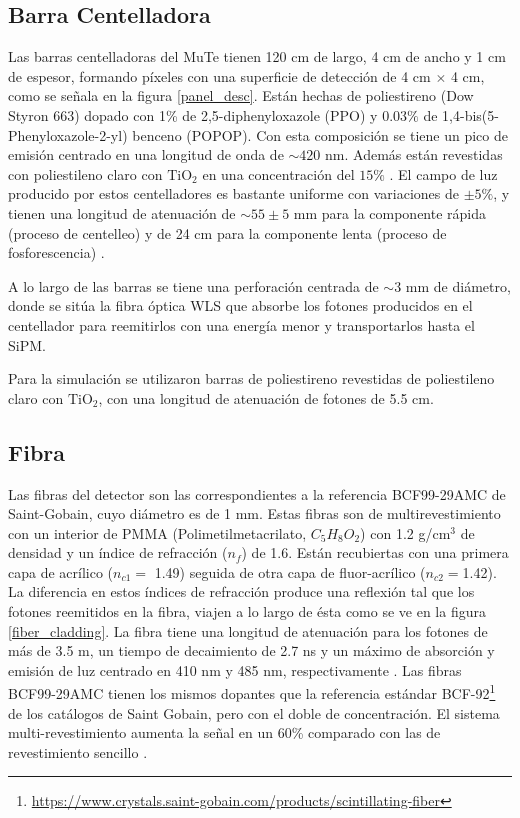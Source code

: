\documentclass[12pt,oneside,openany,letter]{book}
\begin{document}
\subsection{Barra Centelladora}
Las barras centelladoras del MuTe tienen 120 cm de largo, 4 cm de ancho y 1 cm de espesor, formando p\'ixeles con una superficie de detecci\'on de 4 cm $\times$ 4 cm, como se señala en la figura \ref{panel_desc}. Están hechas de poliestireno (Dow Styron 663) dopado con 1\% de 2,5-diphenyloxazole (PPO) y $0.03\%$ de 1,4-bis(5-Phenyloxazole-2-yl) benceno (POPOP). Con esta composición se tiene un pico de emisión centrado en una longitud de onda de $\sim 420 $ nm. Además están revestidas con poliestileno claro con $\text{TiO}_{2}$ en una concentración del $15\%$  \cite{pla-etal2003}. El campo de luz producido por estos centelladores es bastante uniforme con variaciones de $\pm 5 \%$, y tienen una longitud de atenuación de $\sim 55\pm 5$ mm para la componente rápida (proceso de centelleo) y de 24 cm para la componente lenta (proceso de fosforescencia) \cite{amiga-etal2016}.

A lo largo de las barras se tiene una perforación centrada de $\sim 3$ mm de diámetro, donde se sitúa la fibra óptica WLS que absorbe los fotones producidos en el centellador para reemitirlos con una energía menor y transportarlos hasta el SiPM. 

Para la simulaci\'on se utilizaron barras de poliestireno revestidas de poliestileno claro con $\text{TiO}_{2}$, con una longitud de atenuación de fotones de 5.5 cm.

\subsection{Fibra} 
Las fibras del detector son las correspondientes a la referencia BCF99-29AMC de Saint-Gobain, cuyo diámetro es de 1 mm. Estas fibras son de multirevestimiento con un interior de PMMA (Polimetilmetacrilato, $C_5H_8O_2$) con 1.2 g/cm$^3$ de densidad y un índice de refracción ($n_{f}$) de 1.6. Están recubiertas con una primera capa de acrílico ($n_{c1} =$ 1.49) seguida de otra capa de fluor-acrílico ($n_{c2} = $1.42). La diferencia en estos \'indices de refracci\'on produce una reflexión tal que los fotones reemitidos en la fibra, viajen a lo largo de ésta como se ve en la figura \ref{fiber_cladding}. La fibra tiene una longitud de atenuación para los fotones de más de 3.5 m, un tiempo de decaimiento de 2.7 ns y un máximo de absorción y emisión de luz centrado en 410 nm y 485 nm, respectivamente \cite{saint-gobain-fiber}. Las fibras BCF99-29AMC tienen los mismos dopantes que la referencia estándar BCF-92\footnote{\url{https://www.crystals.saint-gobain.com/products/scintillating-fiber}} de los catálogos de Saint Gobain, pero con el doble de concentración. El sistema multi-revestimiento aumenta la señal en un 60\% comparado con las de revestimiento sencillo \cite{amiga-etal2016}. 
\end{document}
